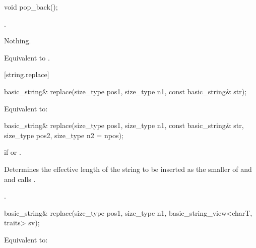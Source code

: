 %
\begin{itemdecl}
void pop_back();
\end{itemdecl}

\begin{itemdescr}
\pnum
\requires
{}.

\pnum
\throws Nothing.

\pnum
\effects
Equivalent to .
\end{itemdescr}

[string.replace]{}

%
\begin{itemdecl}
basic_string&
  replace(size_type pos1, size_type n1,
          const basic_string& str);
\end{itemdecl}

\begin{itemdescr}
\pnum
\effects Equivalent to: 
\end{itemdescr}

%
\begin{itemdecl}
basic_string&
  replace(size_type pos1, size_type n1,
          const basic_string& str,
          size_type pos2, size_type n2 = npos);
\end{itemdecl}

\begin{itemdescr}
\pnum
\throws
{}
if
or
.

\pnum
\effects
Determines the effective length  of the string to be inserted
as the smaller of  and  and calls
.

\pnum
\returns
{}.
\end{itemdescr}

%
\begin{itemdecl}
basic_string& replace(size_type pos1, size_type n1,
                      basic_string_view<charT, traits> sv);
\end{itemdecl}

\begin{itemdescr}
\pnum
\effects
Equivalent to: 
\end{itemdescr}


